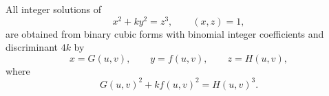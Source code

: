 \begin{proposition}
    All integer solutions of
\[
    x^2+ky^2=z^3,\qquad (x,z)=1,
\]
    are obtained from binary cubic forms with binomial integer coefficients and discriminant $4k$ by
\[
    x=G(u,v),\qquad y=f(u,v),\qquad z=H(u,v),
\]
    where
\[
    G(u,v)^2+kf(u,v)^2=H(u,v)^3.
\]
\end{proposition}
